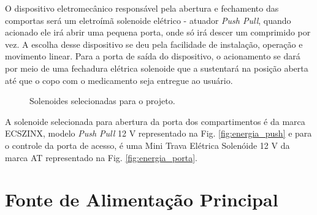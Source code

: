 O dispositivo eletromecânico responsável pela abertura e fechamento das comportas será um eletroímã solenoide elétrico - atuador \textit{Push Pull}, quando acionado ele irá abrir uma pequena porta, onde só irá descer um comprimido por vez. A escolha desse dispositivo se deu pela facilidade de instalação, operação e movimento linear.
Para a porta de saída do dispositivo, o acionamento se dará por meio de uma fechadura elétrica solenoide que a sustentará na posição aberta até que o copo com o medicamento seja entregue ao usuário.

\begin{figure}[H]
\centering
{}
\qquad
{}
\caption{Solenoides selecionadas para o projeto.}
\end{figure}

A solenoide selecionada para abertura da porta dos compartimentos é da marca ECSZINX, modelo \textit{Push Pull} 12 V representado na Fig. \ref{fig:energia_push} e para o controle da porta de acesso, é uma Mini Trava Elétrica Solenóide 12 V da marca AT representado na Fig. \ref{fig:energia_porta}.

\section{Fonte de Alimentação Principal} \label{section:energia_fonte}

 
